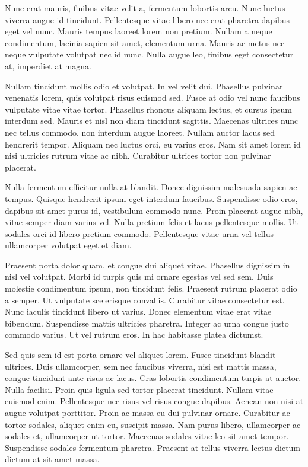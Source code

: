Nunc erat mauris, finibus vitae velit a, fermentum lobortis arcu. Nunc luctus viverra augue id tincidunt. Pellentesque vitae libero nec erat pharetra dapibus eget vel nunc. Mauris tempus laoreet lorem non pretium. Nullam a neque condimentum, lacinia sapien sit amet, elementum urna. Mauris ac metus nec neque vulputate volutpat nec id nunc. Nulla augue leo, finibus eget consectetur at, imperdiet at magna.

Nullam tincidunt mollis odio et volutpat. In vel velit dui. Phasellus pulvinar venenatis lorem, quis volutpat risus euismod sed. Fusce at odio vel nunc faucibus vulputate vitae vitae tortor. Phasellus rhoncus aliquam lectus, et cursus ipsum interdum sed. Mauris et nisl non diam tincidunt sagittis. Maecenas ultrices nunc nec tellus commodo, non interdum augue laoreet. Nullam auctor lacus sed hendrerit tempor. Aliquam nec luctus orci, eu varius eros. Nam sit amet lorem id nisi ultricies rutrum vitae ac nibh. Curabitur ultrices tortor non pulvinar placerat.

Nulla fermentum efficitur nulla at blandit. Donec dignissim malesuada sapien ac tempus. Quisque hendrerit ipsum eget interdum faucibus. Suspendisse odio eros, dapibus sit amet purus id, vestibulum commodo nunc. Proin placerat augue nibh, vitae semper diam varius vel. Nulla pretium felis et lacus pellentesque mollis. Ut sodales orci id libero pretium commodo. Pellentesque vitae urna vel tellus ullamcorper volutpat eget et diam.

Praesent porta dolor quam, et congue dui aliquet vitae. Phasellus dignissim in nisl vel volutpat. Morbi id turpis quis mi ornare egestas vel sed sem. Duis molestie condimentum ipsum, non tincidunt felis. Praesent rutrum placerat odio a semper. Ut vulputate scelerisque convallis. Curabitur vitae consectetur est. Nunc iaculis tincidunt libero ut varius. Donec elementum vitae erat vitae bibendum. Suspendisse mattis ultricies pharetra. Integer ac urna congue justo commodo varius. Ut vel rutrum eros. In hac habitasse platea dictumst.

Sed quis sem id est porta ornare vel aliquet lorem. Fusce tincidunt blandit ultrices. Duis ullamcorper, sem nec faucibus viverra, nisi est mattis massa, congue tincidunt ante risus ac lacus. Cras lobortis condimentum turpis at auctor. Nulla facilisi. Proin quis ligula sed tortor placerat tincidunt. Nullam vitae euismod enim. Pellentesque nec risus vel risus congue dapibus. Aenean non nisi at augue volutpat porttitor. Proin ac massa eu dui pulvinar ornare. Curabitur ac tortor sodales, aliquet enim eu, suscipit massa. Nam purus libero, ullamcorper ac sodales et, ullamcorper ut tortor. Maecenas sodales vitae leo sit amet tempor. Suspendisse sodales fermentum pharetra. Praesent at tellus viverra lectus dictum dictum at sit amet massa.

